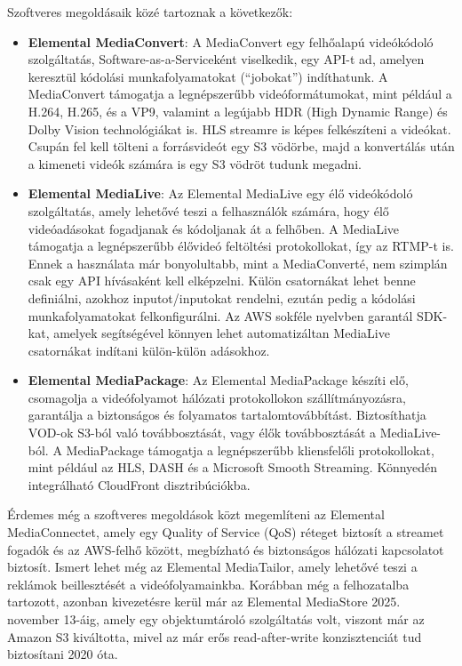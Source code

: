 Szoftveres megoldásaik közé tartoznak a következők: 

\begin{itemize}
  \item \textbf{Elemental MediaConvert}: A MediaConvert egy felhőalapú videókódoló szolgáltatás, Software-as-a-Serviceként viselkedik, egy API-t ad, amelyen keresztül kódolási munkafolyamatokat (``jobokat'') indíthatunk. A MediaConvert támogatja a legnépszerűbb videóformátumokat, mint például a H.264, H.265, és a VP9, valamint a legújabb HDR (High Dynamic Range) és Dolby Vision technológiákat is. HLS streamre is képes felkészíteni a videókat. Csupán fel kell tölteni a forrásvideót egy S3 vödörbe, majd a konvertálás után a kimeneti videók számára is egy S3 vödröt tudunk megadni.
  \item \textbf{Elemental MediaLive}: Az Elemental MediaLive egy élő videókódoló szolgáltatás, amely lehetővé teszi a felhasználók számára, hogy élő videóadásokat fogadjanak és kódoljanak át a felhőben. A MediaLive támogatja a legnépszerűbb élővideó feltöltési protokollokat, így az RTMP-t is. Ennek a használata már bonyolultabb, mint a MediaConverté, nem szimplán csak egy API hívásaként kell elképzelni. Külön csatornákat lehet benne definiálni, azokhoz inputot/inputokat rendelni, ezután pedig a kódolási munkafolyamatokat felkonfigurálni. Az AWS sokféle nyelvben garantál SDK-kat, amelyek segítségével könnyen lehet automatizáltan MediaLive csatornákat indítani külön-külön adásokhoz.
  \item \textbf{Elemental MediaPackage}: Az Elemental MediaPackage készíti elő, csomagolja a videófolyamot hálózati protokollokon szállítmányozásra, garantálja a biztonságos és folyamatos tartalomtovábbítást. Biztosíthatja VOD-ok S3-ból való továbbosztását, vagy élők továbbosztását a MediaLive-ból. A MediaPackage támogatja a legnépszerűbb kliensfelőli protokollokat, mint például az HLS, DASH és a Microsoft Smooth Streaming. Könnyedén integrálható CloudFront disztribúciókba.
\end{itemize}

Érdemes még a szoftveres megoldások közt megemlíteni az Elemental MediaConnectet, amely egy Quality of Service (QoS) réteget biztosít a streamet fogadók és az AWS-felhő között, megbízható és biztonságos hálózati kapcsolatot biztosít. Ismert lehet még az Elemental MediaTailor, amely lehetővé teszi a reklámok beillesztését a videófolyamainkba. Korábban még a felhozatalba tartozott, azonban kivezetésre kerül már az Elemental MediaStore 2025. november 13-áig, amely egy objektumtároló szolgáltatás volt, viszont már az Amazon S3 kiváltotta, mivel az már erős read-after-write konzisztenciát tud biztosítani 2020 óta. \cite{Mediastore}

